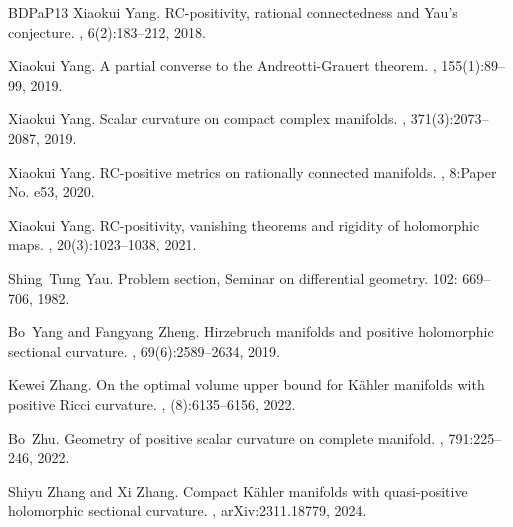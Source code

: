 \documentclass[12pt]{amsart}
\theoremstyle{plain}
\theoremstyle{definition}
\renewcommand{\>}{\rightarrow}
\numberwithin{equation}{section} %
\begin{document}
\begin{thebibliography}{BDPaP13}
		Xiaokui Yang.
		\newblock R{C}-positivity, rational connectedness and {Y}au's conjecture.
		, 6(2):183--212, 2018.
		
		Xiaokui Yang.
		\newblock A partial converse to the {A}ndreotti-{G}rauert theorem.
		, 155(1):89--99, 2019.
		
		Xiaokui Yang.
		\newblock Scalar curvature on compact complex manifolds.
		, 371(3):2073--2087, 2019.
		  

		Xiaokui Yang.
		\newblock R{C}-positive metrics on rationally connected manifolds.
		, 8:Paper No. e53, 2020.
		
		Xiaokui Yang.
		\newblock R{C}-positivity, vanishing theorems and rigidity of holomorphic maps.
		, 20(3):1023--1038, 2021.
		
		
		Shing~Tung Yau.
		\newblock Problem section, Seminar on differential geometry. 
		 102: 669--706, 1982.
		
		Bo~Yang and Fangyang Zheng.
		\newblock Hirzebruch manifolds and positive holomorphic sectional curvature.
		, 69(6):2589--2634, 2019.
		
		Kewei Zhang.
		\newblock On the optimal volume upper bound for {K}\"ahler manifolds with positive {R}icci curvature.
		, (8):6135--6156, 2022.
		
		Bo~Zhu.
		\newblock Geometry of positive scalar curvature on complete manifold.
		, 791:225--246, 2022.

		Shiyu Zhang and Xi Zhang.
		\newblock  Compact {K}\"ahler manifolds with quasi-positive holomorphic sectional curvature.
		, arXiv:2311.18779, 2024.


		\end{thebibliography}
		
	
	
	
\end{document}
